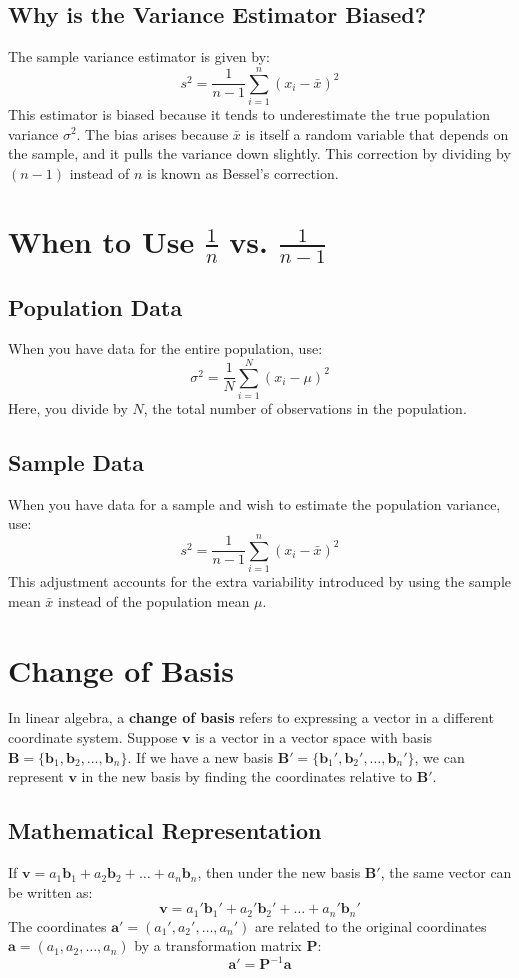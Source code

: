 \documentclass[]{article}
\begin{document}
	\subsection{Why is the Variance Estimator Biased?}
	The sample variance estimator is given by:
	\[
	s^2 = \frac{1}{n-1} \sum_{i=1}^n (x_i - \bar{x})^2
	\]
	This estimator is biased because it tends to underestimate the true population variance $\sigma^2$. The bias arises because $\bar{x}$ is itself a random variable that depends on the sample, and it pulls the variance down slightly. This correction by dividing by $(n-1)$ instead of $n$ is known as Bessel's correction.
	
	\section{When to Use $\frac{1}{n}$ vs. $\frac{1}{n-1}$}
	\subsection{Population Data}
	When you have data for the entire population, use:
	\[
	\sigma^2 = \frac{1}{N} \sum_{i=1}^N (x_i - \mu)^2
	\]
	Here, you divide by $N$, the total number of observations in the population.
	
	\subsection{Sample Data}
	When you have data for a sample and wish to estimate the population variance, use:
	\[
	s^2 = \frac{1}{n-1} \sum_{i=1}^n (x_i - \bar{x})^2
	\]
	This adjustment accounts for the extra variability introduced by using the sample mean $\bar{x}$ instead of the population mean $\mu$.
	
	\section{Change of Basis}
	In linear algebra, a \textbf{change of basis} refers to expressing a vector in a different coordinate system. Suppose $\mathbf{v}$ is a vector in a vector space with basis $\mathbf{B} = \{\mathbf{b}_1, \mathbf{b}_2, \dots, \mathbf{b}_n\}$. If we have a new basis $\mathbf{B}' = \{\mathbf{b}_1', \mathbf{b}_2', \dots, \mathbf{b}_n'\}$, we can represent $\mathbf{v}$ in the new basis by finding the coordinates relative to $\mathbf{B}'$.
	
	\subsection{Mathematical Representation}
	If $\mathbf{v} = a_1 \mathbf{b}_1 + a_2 \mathbf{b}_2 + \dots + a_n \mathbf{b}_n$, then under the new basis $\mathbf{B}'$, the same vector can be written as:
	\[
	\mathbf{v} = a_1' \mathbf{b}_1' + a_2' \mathbf{b}_2' + \dots + a_n' \mathbf{b}_n'
	\]
	The coordinates $\mathbf{a'} = (a_1', a_2', \dots, a_n')$ are related to the original coordinates $\mathbf{a} = (a_1, a_2, \dots, a_n)$ by a transformation matrix $\mathbf{P}$:
	\[
	\mathbf{a'} = \mathbf{P}^{-1} \mathbf{a}
	\]
	
\end{document}

